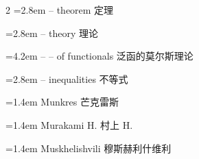 \begin{multicols}{2}
\noindent\hangindent=2.8em -- theorem \quad 定理 \par
\noindent\hangindent=2.8em -- theory \quad 理论 \par
\noindent\hangindent=4.2em -- -- of functionals \quad 泛函的莫尔斯理论 \par
\noindent\hangindent=2.8em -- inequalities \quad 不等式 \par
\noindent\hangindent=1.4em Munkres \quad 芒克雷斯 \par
\noindent\hangindent=1.4em Murakami H. \quad 村上 H. \par
\noindent\hangindent=1.4em Muskhelishvili \quad 穆斯赫利什维利 \par
\end{multicols}

